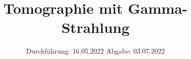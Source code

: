 

\subject{V14}
\title{Tomographie mit Gamma-Strahlung}
\date{%
  Durchführung: 16.05.2022
  \hspace{3em}
  Abgabe: 03.07.2022%
}



\maketitle
\thispagestyle{empty}
\tableofcontents
\newpage







\printbibliography{}


